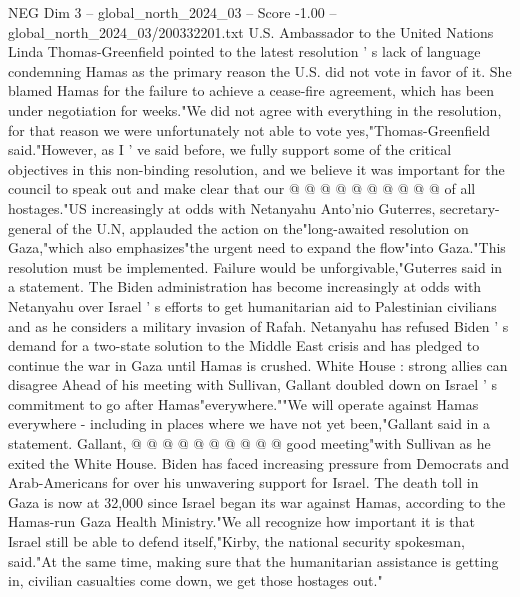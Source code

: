 \begin{textsample}{NEG Dim 3 – global\_north\_2024\_03 – Score -1.00 – global\_north\_2024\_03/200332201.txt}
U.S.
Ambassador to the United Nations Linda Thomas-Greenfield pointed to the latest resolution ' s lack of language condemning Hamas as the primary reason the U.S. did not vote in favor of it.
She blamed Hamas for the failure to achieve a cease-fire agreement, which has been under negotiation for weeks."We did not agree with everything in the resolution, for that reason we were unfortunately not able to vote yes,"Thomas-Greenfield said."However, as I ' ve said before, we fully support some of the critical objectives in this non-binding resolution, and we believe it was important for the council to speak out and make clear that our @ @ @ @ @ @ @ @ @ @ of all hostages."US increasingly at odds with Netanyahu Anto'nio Guterres, secretary-general of the U.N, applauded the action on the"long-awaited resolution on Gaza,"which also emphasizes"the urgent need to expand the flow"into Gaza."This resolution must be implemented.
Failure would be unforgivable,"Guterres said in a statement.
The Biden administration has become increasingly at odds with Netanyahu over Israel ' s efforts to get humanitarian aid to Palestinian civilians and as he considers a military invasion of Rafah.
Netanyahu has refused Biden ' s demand for a two-state solution to the Middle East crisis and has pledged to continue the war in Gaza until Hamas is crushed.
White House : strong allies can disagree Ahead of his meeting with Sullivan, Gallant doubled down on Israel ' s commitment to go after Hamas"everywhere.""We will operate against Hamas everywhere - including in places where we have not yet been,"Gallant said in a statement.
Gallant, @ @ @ @ @ @ @ @ @ @ good meeting"with Sullivan as he exited the White House.
Biden has faced increasing pressure from Democrats and Arab-Americans for over his unwavering support for Israel.
The death toll in Gaza is now at 32,000 since Israel began its war against Hamas, according to the Hamas-run Gaza Health Ministry."We all recognize how important it is that Israel still be able to defend itself,"Kirby, the national security spokesman, said."At the same time, making sure that the humanitarian assistance is getting in, civilian casualties come down, we get those hostages out."

\end{textsample}
